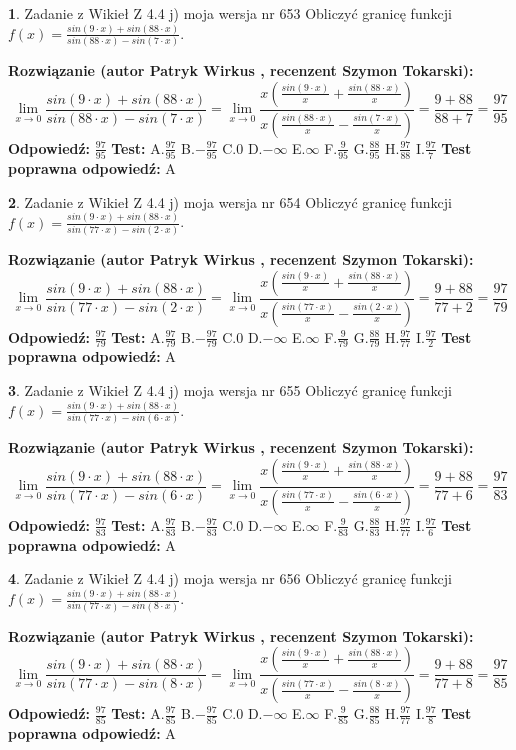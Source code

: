 \documentclass[12pt, a4paper]{article}
\theoremstyle{definition} %
\newtheorem{zad}{}
\newcommand{\zadStart}[1]{\begin{zad}#1\newline}
\newcommand{\zadStop}{\end{zad}}
\newcommand{\rozwStart}[2]{\noindent \textbf{Rozwiązanie (autor #1 , recenzent #2): }\newline}
\newcommand{\rozwStop}{\newline}
\newcommand{\odpStart}{\noindent \textbf{Odpowiedź:}\newline}
\newcommand{\odpStop}{\newline}
\newcommand{\testStart}{\noindent \textbf{Test:}\newline}
\newcommand{\testStop}{\newline}
\newcommand{\kluczStart}{\noindent \textbf{Test poprawna odpowiedź:}\newline}
\newcommand{\kluczStop}{\newline}
\begin{document}
\zadStart{Zadanie z Wikieł Z 4.4 j) moja wersja nr 653}
Obliczyć granicę funkcji $f(x)=\frac{sin(9\cdot x) +sin(88\cdot x)}{sin(88\cdot x) -sin(7\cdot x)}$.
\zadStop
\rozwStart{Patryk Wirkus}{Szymon Tokarski}
$$\lim\limits_{x\to 0}\frac{sin(9\cdot x) +sin(88\cdot x)}{sin(88\cdot x) -sin(7\cdot x)}=\lim\limits_{x\to 0}\frac{x(\frac{sin(9\cdot x)}{x}+\frac{sin(88\cdot x)}{x})}{x(\frac{sin(88\cdot x)}{x}-\frac{sin(7\cdot x)}{x})}=\frac{9+88}{88+7} = \frac{97}{95}$$
\rozwStop
\odpStart
$\frac{97}{95}$
\odpStop
\testStart
A.$\frac{97}{95}$
B.$-\frac{97}{95}$
C.$0$
D.$-\infty$
E.$\infty$
F.$\frac{9}{95}$
G.$\frac{88}{95}$
H.$\frac{97}{88}$
I.$\frac{97}{7}$
\testStop
\kluczStart
A
\kluczStop



\zadStart{Zadanie z Wikieł Z 4.4 j) moja wersja nr 654}
Obliczyć granicę funkcji $f(x)=\frac{sin(9\cdot x) +sin(88\cdot x)}{sin(77\cdot x) -sin(2\cdot x)}$.
\zadStop
\rozwStart{Patryk Wirkus}{Szymon Tokarski}
$$\lim\limits_{x\to 0}\frac{sin(9\cdot x) +sin(88\cdot x)}{sin(77\cdot x) -sin(2\cdot x)}=\lim\limits_{x\to 0}\frac{x(\frac{sin(9\cdot x)}{x}+\frac{sin(88\cdot x)}{x})}{x(\frac{sin(77\cdot x)}{x}-\frac{sin(2\cdot x)}{x})}=\frac{9+88}{77+2} = \frac{97}{79}$$
\rozwStop
\odpStart
$\frac{97}{79}$
\odpStop
\testStart
A.$\frac{97}{79}$
B.$-\frac{97}{79}$
C.$0$
D.$-\infty$
E.$\infty$
F.$\frac{9}{79}$
G.$\frac{88}{79}$
H.$\frac{97}{77}$
I.$\frac{97}{2}$
\testStop
\kluczStart
A
\kluczStop



\zadStart{Zadanie z Wikieł Z 4.4 j) moja wersja nr 655}
Obliczyć granicę funkcji $f(x)=\frac{sin(9\cdot x) +sin(88\cdot x)}{sin(77\cdot x) -sin(6\cdot x)}$.
\zadStop
\rozwStart{Patryk Wirkus}{Szymon Tokarski}
$$\lim\limits_{x\to 0}\frac{sin(9\cdot x) +sin(88\cdot x)}{sin(77\cdot x) -sin(6\cdot x)}=\lim\limits_{x\to 0}\frac{x(\frac{sin(9\cdot x)}{x}+\frac{sin(88\cdot x)}{x})}{x(\frac{sin(77\cdot x)}{x}-\frac{sin(6\cdot x)}{x})}=\frac{9+88}{77+6} = \frac{97}{83}$$
\rozwStop
\odpStart
$\frac{97}{83}$
\odpStop
\testStart
A.$\frac{97}{83}$
B.$-\frac{97}{83}$
C.$0$
D.$-\infty$
E.$\infty$
F.$\frac{9}{83}$
G.$\frac{88}{83}$
H.$\frac{97}{77}$
I.$\frac{97}{6}$
\testStop
\kluczStart
A
\kluczStop



\zadStart{Zadanie z Wikieł Z 4.4 j) moja wersja nr 656}
Obliczyć granicę funkcji $f(x)=\frac{sin(9\cdot x) +sin(88\cdot x)}{sin(77\cdot x) -sin(8\cdot x)}$.
\zadStop
\rozwStart{Patryk Wirkus}{Szymon Tokarski}
$$\lim\limits_{x\to 0}\frac{sin(9\cdot x) +sin(88\cdot x)}{sin(77\cdot x) -sin(8\cdot x)}=\lim\limits_{x\to 0}\frac{x(\frac{sin(9\cdot x)}{x}+\frac{sin(88\cdot x)}{x})}{x(\frac{sin(77\cdot x)}{x}-\frac{sin(8\cdot x)}{x})}=\frac{9+88}{77+8} = \frac{97}{85}$$
\rozwStop
\odpStart
$\frac{97}{85}$
\odpStop
\testStart
A.$\frac{97}{85}$
B.$-\frac{97}{85}$
C.$0$
D.$-\infty$
E.$\infty$
F.$\frac{9}{85}$
G.$\frac{88}{85}$
H.$\frac{97}{77}$
I.$\frac{97}{8}$
\testStop
\kluczStart
A
\kluczStop
\end{document}
